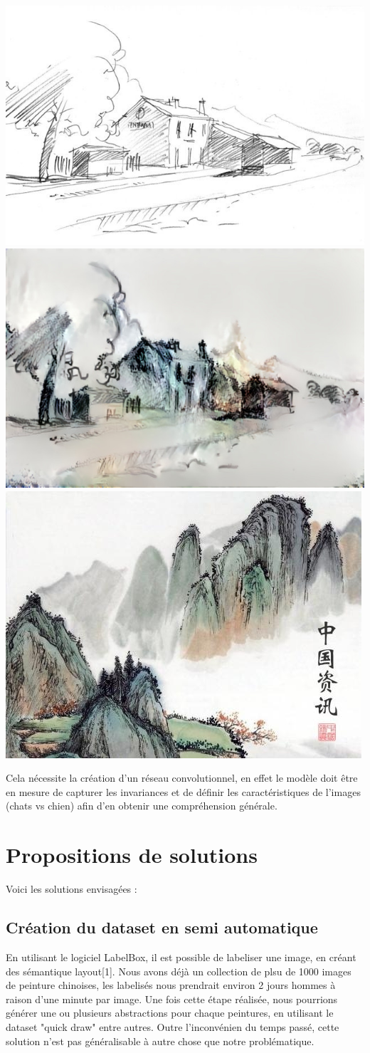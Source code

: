 \documentclass[a4paper, 12pt]{book}
\begin{document}
\includegraphics[width=0.5\linewidth]{images/transfert-style_1.jpg}
\includegraphics[width=0.5\linewidth]{images/transfert-style_2.jpg}
\includegraphics[width=0.5\linewidth]{images/transfert-style_3.jpg}

Cela nécessite la création d'un réseau convolutionnel, en effet le modèle doit être en mesure de capturer les invariances et de définir les caractéristiques de l'images (chats vs chien) afin d'en obtenir une compréhension générale.



\chapter{Propositions de solutions}

Voici les solutions envisagées  :

\section{Création du dataset en semi automatique}

En utilisant le logiciel LabelBox, il est possible de labeliser une image, en créant des sémantique layout[1]. Nous avons déjà un collection de plsu de 1000 images de peinture chinoises, les labelisés nous prendrait environ 2 jours hommes à raison d'une minute par image. Une fois cette étape réalisée, nous pourrions générer une ou plusieurs abstractions pour chaque peintures, en utilisant le dataset "quick draw" entre autres. Outre l'inconvénien du temps passé, cette solution n'est pas généralisable à autre chose que notre problématique.
\end{document}
